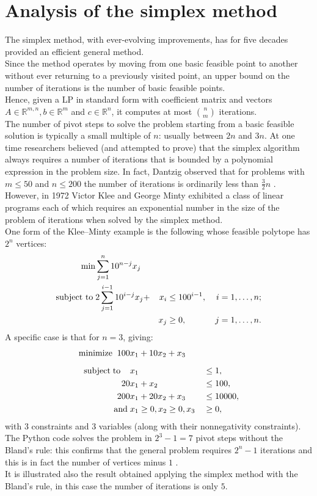 \documentclass[a4paper,10 pt,titlepage,twoside]{report}
\theoremstyle{plain}
\theoremstyle{definition}
\theoremstyle{remark}
\begin{document}
 \section{Analysis of the simplex method}
The simplex method, with ever-evolving improvements, has for five decades provided an efficient general
method. \\
 Since the method operates by moving from one basic feasible point
to another without ever returning to a previously visited point, an upper bound
on the number of iterations is the number of basic feasible points.\\Hence, given a LP in standard form with
coefficient matrix and vectors $A\in\mathbb{R}^{m,n}, b\in\mathbb{R}^{m}$ and $c\in\mathbb{R}^{n}$, it computes at most $n\choose m$ iterations.\\
The number of pivot steps to solve
the problem starting from a basic feasible solution is typically a small multiple of
$n$: usually between $2n$ and $3n$. At one time researchers believed (and attempted to prove) that the simplex algorithm always requires a number of iterations that is
bounded by a polynomial expression in the problem size. In fact, Dantzig observed that for problems with
$m \leq 50$ and $n \leq 200$ the number of iterations is ordinarily less than $\frac{3}{2}n$ \cite{DAN}.
\\ However, in 1972 Victor Klee and George Minty exhibited a class of linear programs each of which requires an
exponential number in the size of the problem of iterations when solved by the simplex method.\\
One form of the Klee–Minty example is the following whose feasible polytope has $2^{n}$
vertices:
\begin{alignat*}{4}
\min &\sum_{j=1}^{n}10^{n-j}x_{j}&&&\\
\text{subject to\;}&2\sum_{j=1}^{i-1}10^{i-j}x_{j}+&x_{i}&\leq 100^{i-1}, \, &i = 1,\dots, n;\\
&&x_{j}&\geq 0, \,&j = 1,\dots, n.\\
\end{alignat*}
A specific case is that for $n = 3$, giving:
\begin{alignat*}{2}
\text{minimize\;}\; 100& x_1+10x_2+ x_3&&\\[2mm]
\text{subject\;to\;\;\;\;} &x_1&&\leq 1,\\
						20& x_1+x_2&&\leq 100,\\
200 &x_1 +20x_2 +x_{3}&&\leq 10000,\\
\text{and}\;& x_1\geq 0,x_2\geq 0,x_3&&\geq 0,
\end{alignat*}
with 3 constraints and 3 variables (along with their nonnegativity constraints).\\
The Python code solves the problem in $2^{3} - 1 = 7$ pivot steps without the Bland's rule: this confirms that the general problem requires $2^{n}- 1$ iterations and this is in fact
the number of vertices minus $1$ \cite{MINTY}.\\ It is illustrated also the result obtained applying the simplex method with the Bland's rule, in this case the number of iterations is only $5$.  \\
\end{document}
